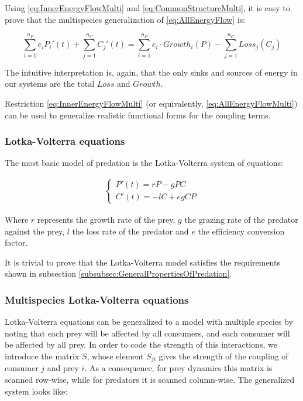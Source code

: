 Using \ref{eq:InnerEnergyFlowMulti} and \ref{eq:CommonStructureMulti}, it is easy to prove that the multispecies generalization of \ref{eq:AllEnergyFlow} is:

\begin{equation}
\label{eq:AllEnergyFlowMulti}
	\sum_{i = 1}^{n_P} e_i P_i'(t) + \sum_{j = 1}^{n_C} C_j'(t) = \sum_{i = 1}^{n_P} e_i \cdot Growth_i(P) - \sum_{j = 1}^{n_C} Loss_j(C_j)
\end{equation}

The intuitive interpretation is, again, that the only sinks and sources of energy in our systems are the total $Loss$ and $Growth$.

Restriction \ref{eq:InnerEnergyFlowMulti} (or equivalently, \ref{eq:AllEnergyFlowMulti}) can be used to generalize realistic functional forms for the coupling terms.

\subsubsection{Lotka-Volterra equations}
\label{subsubsec:LotkaVolterra}

The most basic model of predation is the Lotka-Volterra system of equations:

\begin{eqnarray}
\label{eq:LotkaVolterra}
	\begin{cases}
	P'(t) = r P - g P C
	\\
	C'(t) = - l C + e g C P
	\end{cases}
\end{eqnarray}

Where $r$ represents the growth rate of the prey, $g$ the grazing rate of the predator against the prey, $l$ the loss rate of the predator and $e$ the efficiency conversion factor.

It is trivial to prove that the Lotka-Volterra model satisfies the requirements shown in subsection \ref{subsubsec:GeneralPropertiesOfPredation}.

\subsubsection{Multispecies Lotka-Volterra equations}
\label{subsubsec:LotkaVolterraMulti}

Lotka-Volterra equations can be generalized to a model with multiple species by noting that each prey will be affected by all consumers, and each consumer will be affected by all prey. In order to code the strength of this interactions, we introduce the matrix $S$, whose element $S_{ji}$ gives the strength of the coupling of consumer $j$ and prey $i$. As a consequence, for prey dynamics this matrix is scanned row-wise, while for predators it is scanned column-wise. The generalized system looks like:


